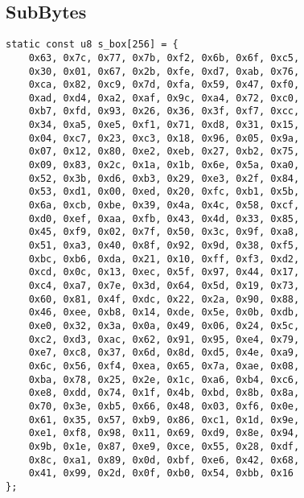 \subsection{SubBytes}

\begin{lstlisting}[style=C, caption={S-Box},captionpos=t]
static const u8 s_box[256] = {
	0x63, 0x7c, 0x77, 0x7b, 0xf2, 0x6b, 0x6f, 0xc5,
	0x30, 0x01, 0x67, 0x2b, 0xfe, 0xd7, 0xab, 0x76,
	0xca, 0x82, 0xc9, 0x7d, 0xfa, 0x59, 0x47, 0xf0,
	0xad, 0xd4, 0xa2, 0xaf, 0x9c, 0xa4, 0x72, 0xc0,
	0xb7, 0xfd, 0x93, 0x26, 0x36, 0x3f, 0xf7, 0xcc,
	0x34, 0xa5, 0xe5, 0xf1, 0x71, 0xd8, 0x31, 0x15,
	0x04, 0xc7, 0x23, 0xc3, 0x18, 0x96, 0x05, 0x9a,
	0x07, 0x12, 0x80, 0xe2, 0xeb, 0x27, 0xb2, 0x75,
	0x09, 0x83, 0x2c, 0x1a, 0x1b, 0x6e, 0x5a, 0xa0,
	0x52, 0x3b, 0xd6, 0xb3, 0x29, 0xe3, 0x2f, 0x84,
	0x53, 0xd1, 0x00, 0xed, 0x20, 0xfc, 0xb1, 0x5b,
	0x6a, 0xcb, 0xbe, 0x39, 0x4a, 0x4c, 0x58, 0xcf,
	0xd0, 0xef, 0xaa, 0xfb, 0x43, 0x4d, 0x33, 0x85,
	0x45, 0xf9, 0x02, 0x7f, 0x50, 0x3c, 0x9f, 0xa8,
	0x51, 0xa3, 0x40, 0x8f, 0x92, 0x9d, 0x38, 0xf5,
	0xbc, 0xb6, 0xda, 0x21, 0x10, 0xff, 0xf3, 0xd2,
	0xcd, 0x0c, 0x13, 0xec, 0x5f, 0x97, 0x44, 0x17,
	0xc4, 0xa7, 0x7e, 0x3d, 0x64, 0x5d, 0x19, 0x73,
	0x60, 0x81, 0x4f, 0xdc, 0x22, 0x2a, 0x90, 0x88,
	0x46, 0xee, 0xb8, 0x14, 0xde, 0x5e, 0x0b, 0xdb,
	0xe0, 0x32, 0x3a, 0x0a, 0x49, 0x06, 0x24, 0x5c,
	0xc2, 0xd3, 0xac, 0x62, 0x91, 0x95, 0xe4, 0x79,
	0xe7, 0xc8, 0x37, 0x6d, 0x8d, 0xd5, 0x4e, 0xa9,
	0x6c, 0x56, 0xf4, 0xea, 0x65, 0x7a, 0xae, 0x08,
	0xba, 0x78, 0x25, 0x2e, 0x1c, 0xa6, 0xb4, 0xc6,
	0xe8, 0xdd, 0x74, 0x1f, 0x4b, 0xbd, 0x8b, 0x8a,
	0x70, 0x3e, 0xb5, 0x66, 0x48, 0x03, 0xf6, 0x0e,
	0x61, 0x35, 0x57, 0xb9, 0x86, 0xc1, 0x1d, 0x9e,
	0xe1, 0xf8, 0x98, 0x11, 0x69, 0xd9, 0x8e, 0x94,
	0x9b, 0x1e, 0x87, 0xe9, 0xce, 0x55, 0x28, 0xdf,
	0x8c, 0xa1, 0x89, 0x0d, 0xbf, 0xe6, 0x42, 0x68,
	0x41, 0x99, 0x2d, 0x0f, 0xb0, 0x54, 0xbb, 0x16
};
\end{lstlisting}

